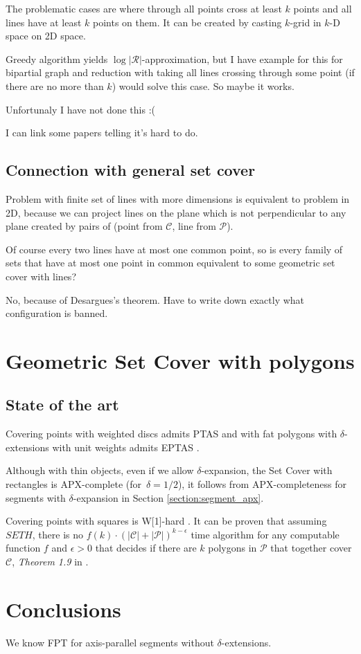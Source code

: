\documentclass[en]{pracamgr}
\newcommand{\points}{\mathcal{C}}
\newcommand{\sets}{\mathcal{P}}
\theoremstyle{plain}
\theoremstyle{definition}
\begin{document}
The problematic cases are where through all points
cross at least $k$ points and all lines have at least $k$ points on them.
It can be created by casting $k$-grid in $k$-D space on 2D space.

Greedy algorithm yields $\log |\mathcal{R}|$-approximation,
but I have example for this for bipartial graph and
reduction with taking all lines crossing through some point
(if there are no more than $k$) would solve this case.
So maybe it works.

Unfortunaly I have not done this :(

I can link some papers telling it's hard to do.

\section{Connection with general set cover}
Problem with finite set of lines with more dimensions
is equivalent
to problem in 2D, because we can project
lines on the plane which is not perpendicular
to any plane created by pairs of
(point from $\mathcal{C}$, line from $\mathcal{P}$).

Of course every two lines have at most one common point,
so is every family of sets that have at most one point
in common equivalent to some geometric set cover with lines?

No, because of Desargues's theorem.
Have to write down exactly what configuration is banned.


\chapter{Geometric Set Cover with polygons}
\section{State of the art}

Covering points with weighted discs admits PTAS \cite{li}
and with fat polygons with $\delta$-extensions with unit weights
admits EPTAS \cite{harpeled12}.

Although with thin objects, even if we allow $\delta$-expansion,
the Set Cover with rectangles
is APX-complete (for~$\delta = 1/2$),
it follows from APX-completeness for segments with $\delta$-expansion
in Section \ref{section:segment_apx}.

Covering points with squares is W[1]-hard \cite{marx05}.
It can be proven that assuming $SETH$,
there is no $f(k)\cdot(|\points|+|\sets|)^{k-\epsilon}$ time algorithm
for any computable function $f$ and $\epsilon >0$ that decides if there
are $k$ polygons in $\sets$ that together cover $\points$,
\textit{Theorem 1.9} in \cite{voronoi}.








\chapter{Conclusions}
We know FPT for axis-parallel segments without $\delta$-extensions.



\end{document}
